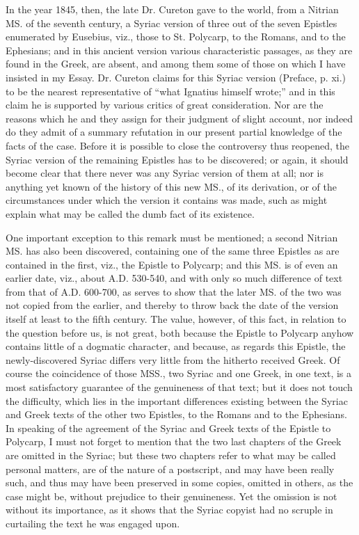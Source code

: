 In the year 1845, then, the
late Dr. Cureton gave to the world, from a Nitrian MS. of the seventh
century, a Syriac version of three out of the seven Epistles
enumerated by Eusebius, viz., those to St. Polycarp, to the Romans,
and to the Ephesians; and in this ancient version various
characteristic passages, as they are found in the Greek, are absent,
and among them some of those on which I have insisted in my Essay. Dr.
Cureton claims for this Syriac version (Preface, p. xi.) to be the
nearest representative of ``what Ignatius himself wrote;'' and in this
claim he is supported by various critics of great consideration. Nor
are the reasons which he and they assign for their judgment of slight
account, nor indeed do they admit of a summary refutation in our
present partial knowledge of the facts of the case. Before it is
possible to close the controversy thus reopened, the Syriac version of
the remaining Epistles has to be discovered; or again, it should
become clear that there never was any Syriac version of them at all;
nor is anything yet known of the history of this new MS., of its
derivation, or of the circumstances under which the version it
contains was made, such as might explain what may be called the dumb
fact of its existence.

One important exception to
this remark must be mentioned; a second Nitrian MS. has also been
discovered, containing one of the same three Epistles as are contained
in the first, viz., the Epistle to Polycarp; and this MS. is of even
an earlier date, viz., about A.D.
530-540, and with only so much difference of text from that of A.D.
600-700, as serves to show that the later MS. of the two was not
copied from the earlier, and thereby to throw back the date of the
version itself at least to the fifth century. The value, however, of
this fact, in relation to the question before us, is not great, both
because the Epistle to Polycarp anyhow contains little of a dogmatic
character, and because, as regards this Epistle, the newly-discovered
Syriac differs very little from the hitherto received Greek. Of course
the coincidence of those MSS., two Syriac and one Greek, in one text,
is a most satisfactory guarantee of the genuineness of that text; but
it does not touch the difficulty, which lies in the important
differences existing between the Syriac and Greek texts of the other
two Epistles, to the Romans and to the Ephesians. In speaking of the
agreement of the Syriac and Greek texts of the Epistle to Polycarp, I
must not forget to mention that the two last chapters of the Greek are
omitted in the Syriac; but these two chapters refer to what may be
called personal matters, are of the nature of a postscript, and may
have been really such, and thus may have been preserved in some
copies, omitted in others, as the case might be, without prejudice to
their genuineness. Yet the omission is not without its importance, as
it shows that the Syriac copyist had no scruple in curtailing the text
he was engaged upon.

